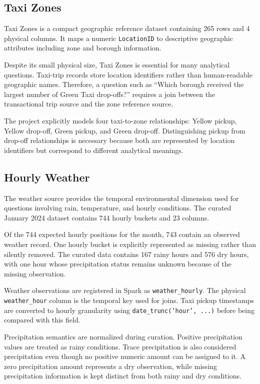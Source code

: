 \subsection{Taxi Zones}

Taxi Zones is a compact geographic reference dataset containing 265 rows and
4 physical columns. It maps a numeric \texttt{LocationID} to descriptive
geographic attributes including zone and borough information.

Despite its small physical size, Taxi Zones is essential for many analytical
questions. Taxi-trip records store location identifiers rather than
human-readable geographic names. Therefore, a question such as ``Which
borough received the largest number of Green Taxi drop-offs?'' requires a
join between the transactional trip source and the zone reference source.

The project explicitly models four taxi-to-zone relationships: Yellow pickup,
Yellow drop-off, Green pickup, and Green drop-off. Distinguishing pickup from
drop-off relationships is necessary because both are represented by location
identifiers but correspond to different analytical meanings.


\subsection{Hourly Weather}

The weather source provides the temporal environmental dimension used for
questions involving rain, temperature, and hourly conditions. The curated
January 2024 dataset contains 744 hourly buckets and 23 columns.

Of the 744 expected hourly positions for the month, 743 contain an observed
weather record. One hourly bucket is explicitly represented as missing rather
than silently removed. The curated data contains 167 rainy hours and 576 dry
hours, with one hour whose precipitation status remains unknown because of
the missing observation.

Weather observations are registered in Spark as
\texttt{weather\_hourly}. The physical \texttt{weather\_hour} column is the
temporal key used for joins. Taxi pickup timestamps are converted to hourly
granularity using \texttt{date\_trunc('hour', ...)} before being compared
with this field.

Precipitation semantics are normalized during curation. Positive
precipitation values are treated as rainy conditions. Trace precipitation is
also considered precipitation even though no positive numeric amount can be
assigned to it. A zero precipitation amount represents a dry observation,
while missing precipitation information is kept distinct from both rainy and
dry conditions.


